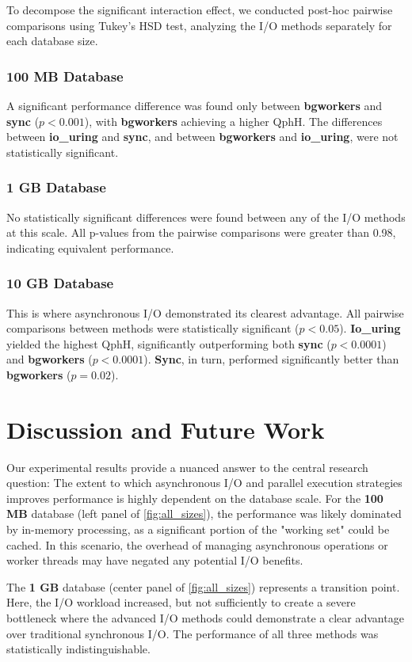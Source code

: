 \documentclass[conference]{IEEEtran}
\begin{document}
To decompose the significant interaction effect, we conducted post-hoc pairwise comparisons using Tukey's HSD test, analyzing the I/O methods separately for each database size.
\subsubsection{100 MB Database}
A significant performance difference was found only between \textbf{bgworkers} and \textbf{sync} ($p < 0.001$), with \textbf{bgworkers} achieving a higher QphH. The differences between \textbf{io\_uring} and \textbf{sync}, and between \textbf{bgworkers} and \textbf{io\_uring}, were not statistically significant.
\subsubsection{1 GB Database}
No statistically significant differences were found between any of the I/O methods at this scale. All p-values from the pairwise comparisons were greater than 0.98, indicating equivalent performance.
\subsubsection{10 GB Database}
This is where asynchronous I/O demonstrated its clearest advantage. All pairwise comparisons between methods were statistically significant ($p < 0.05$). \textbf{Io\_uring} yielded the highest QphH, significantly outperforming both \textbf{sync} ($p < 0.0001$) and \textbf{bgworkers} ($p < 0.0001$). \textbf{Sync}, in turn, performed significantly better than \textbf{bgworkers} ($p = 0.02$).



\section{Discussion and Future Work}
\label{sec:Discussion}

Our experimental results provide a nuanced answer to the central research question: The extent to which asynchronous I/O and parallel execution strategies improves performance is highly dependent on the database scale. For the \textbf{100 MB} database (left panel of \ref{fig:all_sizes}), the performance was likely dominated by in-memory processing, as a significant portion of the "working set" could be cached. In this scenario, the overhead of managing asynchronous operations or worker threads may have negated any potential I/O benefits.

The \textbf{1 GB} database (center panel of \ref{fig:all_sizes}) represents a transition point. Here, the I/O workload increased, but not sufficiently to create a severe bottleneck where the advanced I/O methods could demonstrate a clear advantage over traditional synchronous I/O. The performance of all three methods was statistically indistinguishable.
\end{document}
